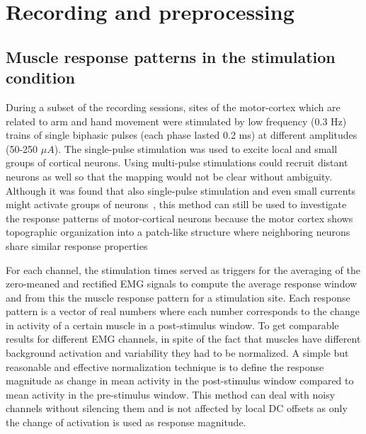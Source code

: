 \documentclass[a4paper]{article}
\begin{document}


%
\section{Recording and preprocessing} %
\label{sg:sec:rec_and_prep}


% 
\subsection{Muscle response patterns in the stimulation condition} %
\label{sg:sub:evoked_responses}

During a subset of the recording sessions, sites of the motor-cortex which are related to arm and hand movement were stimulated by low frequency (0.3 Hz) trains of single biphasic pulses (each phase lasted 0.2 ms) at different amplitudes (50-250 $\mu A$). The single-pulse stimulation was used to excite local and small groups of cortical neurons. Using multi-pulse stimulations could recruit distant neurons as well so that the mapping would not be clear without ambiguity. Although it was found that also single-pulse stimulation and even small currents might activate groups of neurons~\cite{Tehovnik:1996p3982}, this method can still be used to investigate the response patterns of motor-cortical neurons because the motor cortex shows topographic organization into a patch-like structure where neighboring neurons share similar response properties~\cite{Lee:1998p4164}

For each channel, the stimulation times served as triggers for the averaging of the zero-meaned and rectified EMG signals to compute the average response window and from this the muscle response pattern for a stimulation site. Each response pattern is a vector of real numbers where each number corresponds to the change in activity of a certain muscle in a post-stimulus window. To get comparable results for different EMG channels, in spite of the fact that muscles have different background activation and variability they had to be normalized. A simple but reasonable and effective normalization technique is to define the response magnitude as change in mean activity in the post-stimulus window compared to mean activity in the pre-stimulus window. This method can deal with noisy channels without silencing them and is not affected by local DC offsets as only the change of activation is used as response magnitude. 
\end{document}
